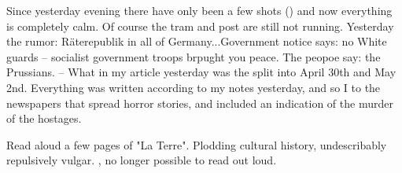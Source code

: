 
Since yesterday evening there have only been a few shots () and now everything is completely calm. Of course the tram and post are still not running. Yesterday the rumor: Räterepublik in all of Germany...Government notice says: no White guards -- socialist government troops brpught you peace. The peopoe say: the Prussians. -- What  in my article yesterday was the split into April 30th and May 2nd. Everything was written according to my notes yesterday, and so I  to the newspapers that spread horror stories, and included an indication of the murder of the hostages.

Read aloud a few pages of "La Terre". Plodding cultural history, undescribably repulsively vulgar. , no longer possible to read out loud.